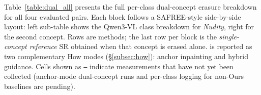 Table~\ref{table:dual_all} presents the full per-class dual-concept erasure breakdown for all four evaluated pairs. Each block follows a SAFREE-style side-by-side layout: left sub-table shows the Qwen3-VL class breakdown for \emph{Nudity}, right for the second concept. Rows are methods; the last row per block is the \emph{single-concept reference} SR obtained when that concept is erased alone. \ours{} is reported as two complementary How modes (\S\ref{subsec:how}): anchor inpainting and hybrid guidance. Cells shown as \texttt{--} indicate measurements that have not yet been collected (anchor-mode dual-concept runs and per-class logging for non-Ours baselines are pending).

\begin{table}[h]
    \centering
    \renewcommand{\arraystretch}{1.15}
    \setlength{\tabcolsep}{0.35em}
    \caption{Full per-class dual-concept erasure breakdown for all four pairs. SR~$=$~(Safe~$+$~Partial)$/$Total~$\uparrow$. Blocks share the same side-by-side layout (Nudity / 2nd concept).}
    \label{table:dual_all}
    \vspace{2pt}
    \small
\end{table}
